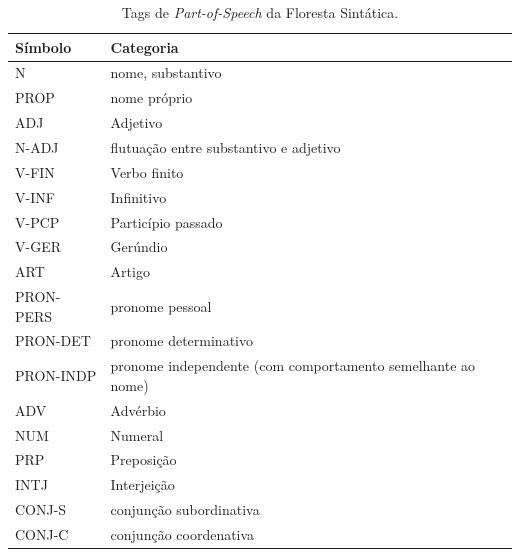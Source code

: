 \begin{table}[H]
   \centering
   \small
   \caption{ Tags de \emph{Part-of-Speech} da Floresta Sintática.}

    \begin{tabular}{ | p{3cm} | p{10cm} |}
      \hline
        \textbf{Símbolo} & \textbf{Categoria}\\
        \hline
        \hline

    N&nome, substantivo\\
    \hline
    PROP&nome próprio\\
    \hline
    ADJ&Adjetivo\\
    \hline
    N-ADJ&flutuação entre substantivo e adjetivo\\
    \hline
    V-FIN&Verbo finito\\
    \hline
    V-INF&Infinitivo\\
    \hline
    V-PCP&Particípio passado\\
    \hline
    V-GER&Gerúndio\\
    \hline
    ART&Artigo\\
    \hline
    PRON-PERS&pronome pessoal\\
    \hline
    PRON-DET&pronome determinativo\\
    \hline
    PRON-INDP&pronome independente (com comportamento semelhante ao nome)\\
    \hline
    ADV&Advérbio\\
    \hline
    NUM&Numeral\\
    \hline
    PRP&Preposição\\
    \hline
    INTJ&Interjeição\\
    \hline
    CONJ-S&conjunção subordinativa\\
    \hline
    CONJ-C&conjunção coordenativa\\
\hline

   \end{tabular}
   \label{tbl:floresta_sintatica_pos}
\end{table}


